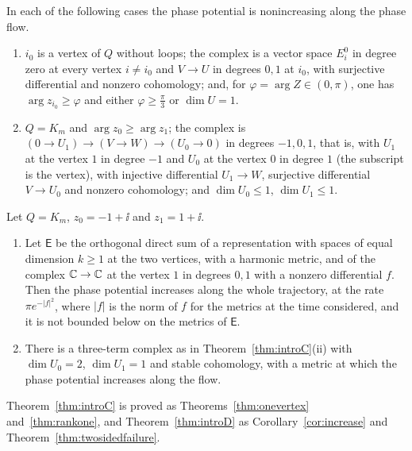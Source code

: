 \begin{theorem}\label{thm:introC}
In each of the following cases the phase potential is nonincreasing along the
phase flow.
\begin{enumerate}
\item[(i)] $i_0$ is a vertex of $Q$ without loops; the complex is a vector
 space $E_i^0$ in degree zero at every vertex $i\neq i_0$ and $V\to U$ in
 degrees $0,1$ at $i_0$, with surjective differential and nonzero
 cohomology; and, for $\varphi=\arg Z\in(0,\pi)$, one has
 $\arg z_{i_0}\geq\varphi$ and either $\varphi\geq\frac{\pi}3$ or
 $\dim U=1$.
\item[(ii)] $Q=K_m$ and $\arg z_0\geq\arg z_1$; the complex is
 $(0\to U_1)\to(V\to W)\to(U_0\to0)$ in degrees $-1,0,1$, that is, with $U_1$
 at the vertex $1$ in degree $-1$ and $U_0$ at the vertex $0$ in degree $1$
 (the subscript is the vertex), with injective differential $U_1\to W$,
 surjective differential $V\to U_0$ and nonzero cohomology; and
 $\dim U_0\leq1$, $\dim U_1\leq1$.
\end{enumerate}
\end{theorem}

\begin{theorem}\label{thm:introD}
Let $Q=K_m$, $z_0=-1+\ii$ and $z_1=1+\ii$.
\begin{enumerate}
\item[(i)] Let $\mathsf E$ be the orthogonal direct sum of a representation
 with spaces of equal dimension $k\geq1$ at the two vertices, with a harmonic
 metric, and of the complex $\mathbb C\to\mathbb C$ at the vertex $1$ in degrees $0,1$
 with a nonzero differential $f$. Then the phase potential increases along
 the whole trajectory, at the rate $\pi e^{-|f|^2}$, where $|f|$ is the norm
 of $f$ for the metrics at the time considered, and it is not bounded below
 on the metrics of $\mathsf E$.
\item[(ii)] There is a three-term complex as in
 Theorem~\ref{thm:introC}(ii) with $\dim U_0=2$, $\dim U_1=1$ and stable
 cohomology, with a metric at which the phase potential increases along the
 flow.
\end{enumerate}
\end{theorem}

Theorem~\ref{thm:introC} is proved as Theorems~\ref{thm:onevertex}
and~\ref{thm:rankone}, and Theorem~\ref{thm:introD} as
Corollary~\ref{cor:increase} and Theorem~\ref{thm:twosidedfailure}.

